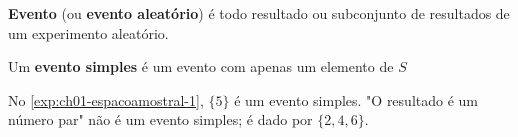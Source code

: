 \begin{definition}
    \textbf{Evento} (ou \textbf{evento aleatório}) é todo resultado ou 
    subconjunto de resultados
    de um experimento aleatório.

    Um \textbf{evento simples} é um evento com apenas um elemento de $S$
\end{definition}

\begin{example}\label{exp:ch01:evento-1}
    No \cref{exp:ch01-espacoamostral-1}, $\{5\}$ é um evento simples.
    "O resultado é um número par" não é um evento simples; é dado
    por $\{2, 4, 6\}$.
\end{example}
